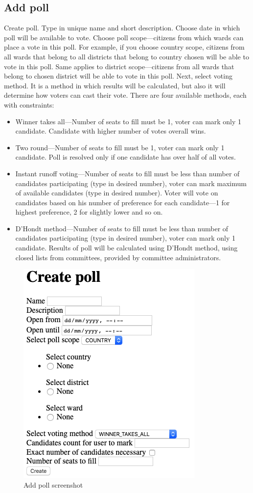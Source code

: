 \documentclass[a4paper,twoside,12pt]{book}
\begin{document}
    \subsection{Add poll}
      Create poll. Type in unique name and short description. Choose date in which poll will be available to vote.
      Choose poll scope---citizens from which wards can place a vote in this poll.
      For example, if you choose country scope, citizens from all wards that belong to all districts that belong to country chosen will be able to vote in this poll.
      Same applies to district scope---citizens from all wards that belong to chosen district will be able to vote in this poll.
      Next, select voting method. It is a method in which results will be calculated, but also it will determine how voters can cast their vote.
      There are four available methods, each with constraints:
      \begin{itemize}
        \item Winner takes all---Number of seats to fill must be 1, voter can mark only 1 candidate. Candidate with higher number of votes overall wins.
        \item Two round---Number of seats to fill must be 1, voter can mark only 1 candidate. Poll is resolved only if one candidate has over half of all votes.
        \item Instant runoff voting---Number of seats to fill must be less than number of candidates participating (type in desired number),
        voter can mark maximum of available candidates (type in desired number).
        Voter will vote on candidates based on his number of preference for each candidate---1 for highest preference, 2 for slightly lower and so on.
        \item D'Hondt method---Number of seats to fill must be less than number of candidates participating (type in desired number),
        voter can mark only 1 candidate. Results of poll will be calculated using D'Hondt method, using closed lists from committees, provided by committee administrators.
      \end{itemize}
      \begin{figure}[h]
        \centering
        \includegraphics[width=0.4\linewidth]{add_poll_screenshot.png}
        \caption{Add poll screenshot}
        \label{fig:add_poll_screenshot}
      \end{figure}
\end{document}
